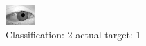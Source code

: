 \begin{figure}[h!]
\begin{center}
\includegraphics[width=0.60\columnwidth]{figures/ID2739_class_2_target_1.png}
\end{center}
\caption{ Classification: 2 actual target: 1}
\label{fig:ID2739_class_2_target_1}
\end{figure}
